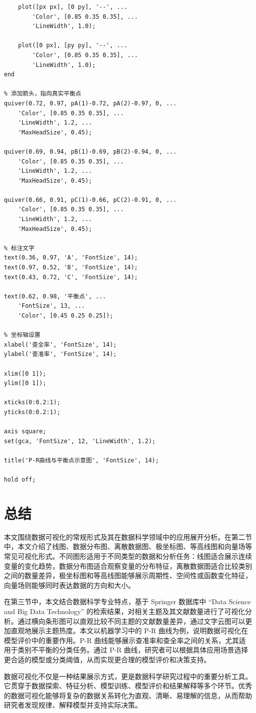 \documentclass[UTF8,12pt]{ctexart}
\begin{document}
\begin{lstlisting}
    plot([px px], [0 py], '--', ...
        'Color', [0.85 0.35 0.35], ...
        'LineWidth', 1.0);

    plot([0 px], [py py], '--', ...
        'Color', [0.85 0.35 0.35], ...
        'LineWidth', 1.0);
end

% 添加箭头，指向真实平衡点
quiver(0.72, 0.97, pA(1)-0.72, pA(2)-0.97, 0, ...
    'Color', [0.85 0.35 0.35], ...
    'LineWidth', 1.2, ...
    'MaxHeadSize', 0.45);

quiver(0.69, 0.94, pB(1)-0.69, pB(2)-0.94, 0, ...
    'Color', [0.85 0.35 0.35], ...
    'LineWidth', 1.2, ...
    'MaxHeadSize', 0.45);

quiver(0.66, 0.91, pC(1)-0.66, pC(2)-0.91, 0, ...
    'Color', [0.85 0.35 0.35], ...
    'LineWidth', 1.2, ...
    'MaxHeadSize', 0.45);

% 标注文字
text(0.36, 0.97, 'A', 'FontSize', 14);
text(0.97, 0.52, 'B', 'FontSize', 14);
text(0.43, 0.72, 'C', 'FontSize', 14);

text(0.62, 0.98, '平衡点', ...
    'FontSize', 13, ...
    'Color', [0.45 0.25 0.25]);

% 坐标轴设置
xlabel('查全率', 'FontSize', 14);
ylabel('查准率', 'FontSize', 14);

xlim([0 1]);
ylim([0 1]);

xticks(0:0.2:1);
yticks(0:0.2:1);

axis square;
set(gca, 'FontSize', 12, 'LineWidth', 1.2);

title('P-R曲线与平衡点示意图', 'FontSize', 14);

hold off;
\end{lstlisting}

\section{总结}
本文围绕数据可视化的常规形式及其在数据科学领域中的应用展开分析。在第二节中，本文介绍了线图、数据分布图、离散数据图、极坐标图、等高线图和向量场等常见可视化形式。不同图形适用于不同类型的数据和分析任务：线图适合展示连续变量的变化趋势，数据分布图适合观察变量的分布特征，离散数据图适合比较类别之间的数量差异，极坐标图和等高线图能够展示周期性、空间性或函数变化特征，向量场则能够同时表达数据的方向和大小。

在第三节中，本文结合数据科学专业特点，基于 Springer 数据库中 ``Data Science and Big Data Technology'' 的检索结果，对相关主题及其文献数量进行了可视化分析。通过横向条形图可以直观比较不同主题的文献数量差异，通过文字云图可以更加直观地展示主题热度。本文以机器学习中的 P-R 曲线为例，说明数据可视化在模型评价中的重要作用。P-R 曲线能够展示查准率和查全率之间的关系，尤其适用于类别不平衡的分类任务。通过 P-R 曲线，研究者可以根据具体应用场景选择更合适的模型或分类阈值，从而实现更合理的模型评价和决策支持。

数据可视化不仅是一种结果展示方式，更是数据科学研究过程中的重要分析工具。它贯穿于数据探索、特征分析、模型训练、模型评价和结果解释等多个环节。优秀的数据可视化能够将复杂的数据关系转化为直观、清晰、易理解的信息，从而帮助研究者发现规律、解释模型并支持实际决策。
\end{document}
